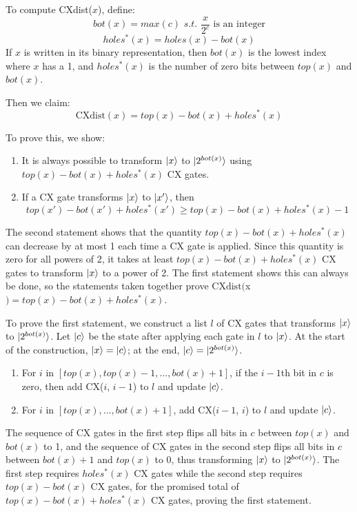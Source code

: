 \documentclass{article}
\begin{document}
To compute CXdist($x$), define:
$$bot(x) = max(c) \textit{ s.t. } \frac{x}{2^c} \text{ is an integer}$$
$$holes^*(x) = holes(x) - bot(x)$$
If $x$ is written in its binary representation, then $bot(x)$ is the lowest
index where $x$ has a 1, and $holes^*(x)$ is the number of zero bits between
$top(x)$ and $bot(x)$.

Then we claim:
$$\text{CXdist}(x) = top(x) - bot(x) + holes^*(x)$$

To prove this, we show:
\begin{enumerate}
    \item It is always possible to transform $\mathinner{|{x}\rangle}$ to $\mathinner{|{2^{bot(x)}}\rangle}$
      using $top(x) - bot(x) + holes^*(x)$ CX gates.
    \item If a CX gate transforms $\mathinner{|{x}\rangle}$ to $\mathinner{|{x'}\rangle}$, then
      $$top(x') - bot(x') + holes^*(x') \geq top(x) - bot(x) + holes^*(x) - 1$$
\end{enumerate}

The second statement shows that the quantity $top(x) - bot(x) + holes^*(x)$ can
decrease by at most 1 each time a CX gate is applied. Since this quantity is
zero for all powers of 2, it takes at least $top(x) - bot(x) + holes^*(x)$ CX
gates to transform $\mathinner{|{x}\rangle}$ to a power of 2. The first statement shows this can
always be done, so the statements taken together prove 
$\text{CXdist}($x$) = top(x) - bot(x) + holes^*(x)$.

To prove the first statement, we construct a list $l$ of CX gates that
transforms $\mathinner{|{x}\rangle}$ to $\mathinner{|{2^{bot(x)}}\rangle}$. Let $\mathinner{|{c}\rangle}$ be the state after
applying each gate in $l$ to $\mathinner{|{x}\rangle}$. At the start of the construction,
$\mathinner{|{x}\rangle} = \mathinner{|{c}\rangle}$; at the end, $\mathinner{|{c}\rangle} = \mathinner{|{2^{bot(x)}}\rangle}$.
\begin{enumerate}
  \item For $i$ in $[top(x), top(x) - 1, ..., bot(x) + 1]$, if the $i - 1$th bit
  in $c$ is zero, then add CX($i$, $i - 1$) to $l$ and update $\mathinner{|{c}\rangle}$.
  \item For $i$ in $[top(x), ..., bot(x) + 1]$, add CX($i - 1$, $i$) to $l$ and
  update $\mathinner{|{c}\rangle}$.
\end{enumerate}

The sequence of CX gates in the first step flips all bits in $c$ between 
$top(x)$ and $bot(x)$ to 1, and the sequence of CX gates in the second step
flips all bits in $c$ between $bot(x) + 1$ and $top(x)$ to 0, thus transforming
$\mathinner{|{x}\rangle}$ to $\mathinner{|{2^{bot(x)}}\rangle}$. The first step requires $holes^*(x)$ CX gates
while the second step requires $top(x) - bot(x)$ CX gates, for the promised
total of $top(x) - bot(x) + holes^*(x)$ CX gates, proving the first statement.
\end{document}
